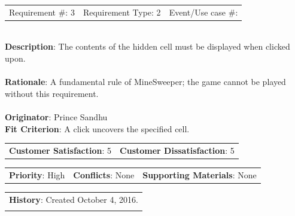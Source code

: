 \documentclass[12pt, titlepage]{article}
\begin{document}
\begin{reqbox}

\begin{tabular}{lll}
Requirement \#: 3 & Requirement Type: 2 & Event/Use case \#: \\
\end{tabular} \\

\textbf{Description}: The contents of the hidden cell must be displayed when clicked upon. \\ \\
\textbf{Rationale}: A fundamental rule of MineSweeper; the game cannot be played without this 					    requirement.\\ \\
\textbf{Originator}: Prince Sandhu \\
\textbf{Fit Criterion}: A click uncovers the specified cell.\\

\begin{tabular}{ll}
\textbf{Customer Satisfaction}: 5 & \textbf{Customer Dissatisfaction}: 5 \\
\end{tabular}

\begin{tabular}{lll}
\textbf{Priority}: High & \textbf{Conflicts}: None & \textbf{Supporting Materials}: None \\
\end{tabular}

\begin{tabular}{l}
\textbf{History}: Created October 4, 2016.\\ \\
\end{tabular} \\

\end{reqbox}
\end{document}
